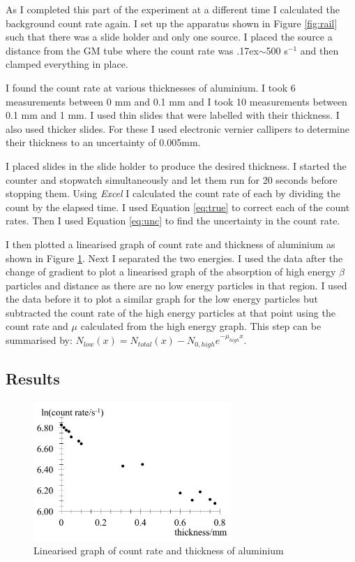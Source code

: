 \documentclass[twocolumn]{revtex4-1}
\begin{document}
As I completed this part of the experiment at a different time I calculated the background count rate again.
I set up the apparatus shown in Figure \ref{fig:rail} such that there was a slide holder and only one source.
I placed the source a distance from the GM tube where the count rate was {\raise.17ex\hbox{$\scriptstyle\mathtt{\sim}$}}500 s$^{-1}$ and then clamped everything in place.

I found the count rate at various thicknesses of aluminium. 
I took 6 measurements between 0 mm and 0.1 mm and I took 10 measurements between 0.1 mm and 1 mm.
I used thin slides that were labelled with their thickness.
I also used thicker slides. For these I used electronic vernier callipers to determine their thickness to an uncertainty of 0.005mm.

I placed slides in the slide holder to produce the desired thickness.
I started the counter and stopwatch simultaneously and let them run for 20 seconds before stopping them.
Using \textit{Excel\textregistered} I calculated the count rate of each by dividing the count by the elapsed time.
I used Equation \ref{eq:true} to correct each of the count rates.
Then I used Equation \ref{eq:unc} to find the uncertainty in the count rate.

I then plotted a linearised graph of count rate and thickness of aluminium as shown in Figure \ref{fig:al}.
Next I separated the two energies.
I used the data after the change of gradient to plot a linearised graph of the absorption of high energy $\beta$ particles and distance as there are no low energy particles in that region.
I used the data before it to plot a similar graph for the low energy particles but subtracted the count rate of the high energy particles at that point using the count rate and $\mu$ calculated from the high energy graph.
This step can be summarised by: $N_{low}(x)=N_{total}(x)-N_{0,high}e^{-\mu_{high} x}$.

\vspace{-2ex}
\subsection{Results} 
\vspace{-4ex}

\begin{figure}[!h]
\begin{center}
\includegraphics[width=7.5cm]{al}
\caption{Linearised graph of count rate and thickness of aluminium}
\label{fig:al}
\end{center}
\end{figure}
\end{document}
